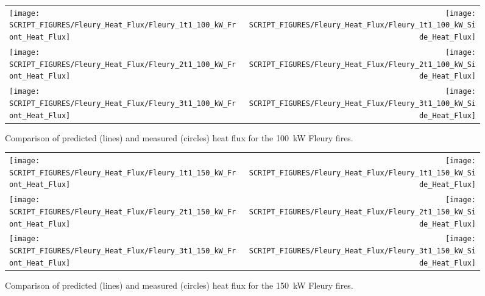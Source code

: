 \begin{figure}[h!]
\begin{tabular*}{\textwidth}{l@{\extracolsep{\fill}}r}
\texttt{[image: SCRIPT\_FIGURES/Fleury\_Heat\_Flux/Fleury\_1t1\_100\_kW\_Front\_Heat\_Flux]} &
\texttt{[image: SCRIPT\_FIGURES/Fleury\_Heat\_Flux/Fleury\_1t1\_100\_kW\_Side\_Heat\_Flux]} \\
\texttt{[image: SCRIPT\_FIGURES/Fleury\_Heat\_Flux/Fleury\_2t1\_100\_kW\_Front\_Heat\_Flux]} &
\texttt{[image: SCRIPT\_FIGURES/Fleury\_Heat\_Flux/Fleury\_2t1\_100\_kW\_Side\_Heat\_Flux]} \\
\texttt{[image: SCRIPT\_FIGURES/Fleury\_Heat\_Flux/Fleury\_3t1\_100\_kW\_Front\_Heat\_Flux]} &
\texttt{[image: SCRIPT\_FIGURES/Fleury\_Heat\_Flux/Fleury\_3t1\_100\_kW\_Side\_Heat\_Flux]}
\end{tabular*}
\label{Fleury_Heat_Flux_100_kW}
\caption[Fleury Heat Flux, 100 kW fires.]
{Comparison of predicted (lines) and measured (circles) heat flux for the 100~kW Fleury fires.}
\end{figure}

\newpage

\begin{figure}[p]
\begin{tabular*}{\textwidth}{l@{\extracolsep{\fill}}r}
\texttt{[image: SCRIPT\_FIGURES/Fleury\_Heat\_Flux/Fleury\_1t1\_150\_kW\_Front\_Heat\_Flux]} &
\texttt{[image: SCRIPT\_FIGURES/Fleury\_Heat\_Flux/Fleury\_1t1\_150\_kW\_Side\_Heat\_Flux]} \\
\texttt{[image: SCRIPT\_FIGURES/Fleury\_Heat\_Flux/Fleury\_2t1\_150\_kW\_Front\_Heat\_Flux]} &
\texttt{[image: SCRIPT\_FIGURES/Fleury\_Heat\_Flux/Fleury\_2t1\_150\_kW\_Side\_Heat\_Flux]} \\
\texttt{[image: SCRIPT\_FIGURES/Fleury\_Heat\_Flux/Fleury\_3t1\_150\_kW\_Front\_Heat\_Flux]} &
\texttt{[image: SCRIPT\_FIGURES/Fleury\_Heat\_Flux/Fleury\_3t1\_150\_kW\_Side\_Heat\_Flux]}
\end{tabular*}
\label{Fleury_Heat_Flux_150_kW}
\caption[Fleury Heat Flux, 150 kW fires.]
{Comparison of predicted (lines) and measured (circles) heat flux for the 150~kW Fleury fires.}
\end{figure}

